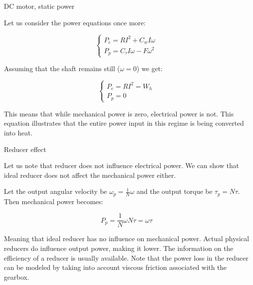 \documentclass{beamer}
\begin{document}
\begin{frame}{DC motor, static power}
	\begin{flushleft}
		
		Let us consider the power equations once more:
		
		\begin{equation}
			\begin{cases}
				P_e = RI^2 + C_w I\omega\\
				P_p = C_\tau I\omega - F \omega^2
			\end{cases}
		\end{equation}
		
		Assuming that the shaft remains still ($\omega = 0$) we get:
		
		\begin{equation}
			\begin{cases}
			P_e = RI^2 = W_h\\
			P_p = 0
			\end{cases}
		\end{equation}
		
		This means that while mechanical power is zero, electrical power is not. This equation illustrates that the entire power input in this regime is being converted into heat.
		
		
	\end{flushleft}
\end{frame}



\begin{frame}{Reducer effect}
	\begin{flushleft}
		
		Let us note that reducer does not influence electrical power. We can show that ideal reducer does not affect the mechanical power either.
		
		\bigskip
		
		Let the output angular velocity be $\omega_p = \frac{1}{N}\omega$ and the output torque be $\tau_p = N\tau$. Then mechanical power becomes:
		
		\begin{equation}
			P_p = \frac{1}{N}\omega N\tau = \omega \tau
		\end{equation}
		
		Meaning that ideal reducer has no influence on mechanical power. Actual physical reducers do influence output power, making it lower. The information on the efficiency of a reducer is usually available. Note that the power loss in the reducer can be modeled by taking into account viscous friction associated with the gearbox.
		
	\end{flushleft}
\end{frame}
\end{document}
